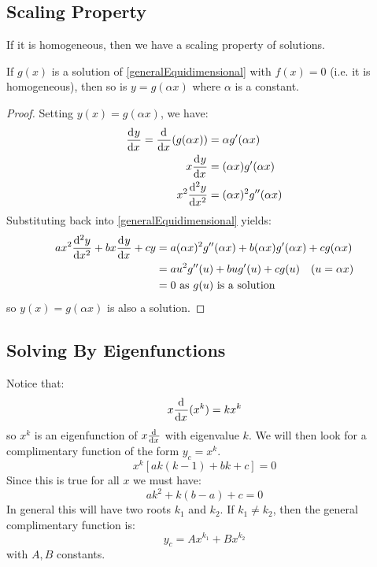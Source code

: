 \documentclass[../main.tex]{subfiles}
\begin{document}
\subsection{Scaling Property}
If it is homogeneous, then we have a scaling property of solutions.
\begin{proposition}
  If $g(x)$ is a solution of \cref{generalEquidimensional} with $f(x) = 0$ (i.e. it is homogeneous), then so is $y = g(\alpha x)$ where $\alpha$ is a constant.
\end{proposition}
\begin{proof}
  Setting $y(x) = g(\alpha x)$, we have:
  \begin{align*}
    \deriv{y}{x} = \deriv{}{x}(g(\alpha x)) &= \alpha g'(\alpha x) \\
    x \deriv{y}{x} &= (\alpha x)g'(\alpha x) \\
    x^2 \deriv[2]{y}{x} &= (\alpha x)^2 g''(\alpha x)
  \end{align*}
  Substituting back into \cref{generalEquidimensional} yields:
  \begin{align*}
    ax^2 \deriv[2]{y}{x} + bx \deriv{y}{x} + cy &= a (\alpha x)^2 g''(\alpha x) + b(\alpha x)g'(\alpha x) + cg(\alpha x) \\
                                                &= au^2 g''(u) + bu g'(u) + cg(u) \text{\quad($u = \alpha x$)}\\
                                                &=0 \text{ as $g(u)$ is a solution}
  \end{align*}
  so $y(x) = g(\alpha x)$ is also a solution.
\end{proof}

\subsection{Solving By Eigenfunctions}
\label{solvingByEigenfunctions}
Notice that:
\[
  x \deriv{}{x}(x^{k}) = k x^{k}
\]
so $x^{k}$ is an eigenfunction of $x \deriv{}{x}$ with eigenvalue $k$.
We will then look for a complimentary function of the form $y_c = x^{k}$.
\[
  x^{k}[ak(k - 1) + bk + c] = 0
\]
Since this is true for all $x$ we must have:
\[
  ak^2 + k(b - a) + c = 0
\]
In general this will have two roots $k_1$ and $k_2$.
If $k_1 \neq k_2$, then the general complimentary function is:
\[
  y_c = Ax^{k_1} + Bx^{k_2}
\]
with $A, B$ constants.
\end{document}
